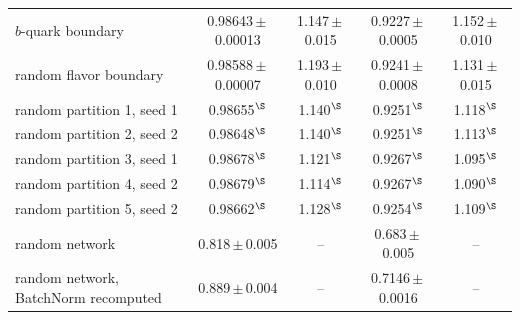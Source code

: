 \begin{landscape}
{\begin{center}
\begin{minipage}{\linewidth}
\begin{tabular*}{\linewidth}{@{\extracolsep{\fill}}lcccc@{}}
\quad $b$-quark boundary & 0.98643\,$\pm$\,0.00013 & 1.147\,$\pm$\,0.015 & 0.9227\,$\pm$\,0.0005 & 1.152\,$\pm$\,0.010 \\
\quad random flavor boundary & 0.98588\,$\pm$\,0.00007 & 1.193\,$\pm$\,0.010 & 0.9241\,$\pm$\,0.0008 & 1.131\,$\pm$\,0.015 \\
\quad random partition 1, seed 1 & 0.98655$^{\S}$ & 1.140$^{\S}$ & 0.9251$^{\S}$ & 1.118$^{\S}$ \\
\quad random partition 2, seed 2 & 0.98648$^{\S}$ & 1.140$^{\S}$ & 0.9251$^{\S}$ & 1.113$^{\S}$ \\
\quad random partition 3, seed 1 & 0.98678$^{\S}$ & 1.121$^{\S}$ & 0.9267$^{\S}$ & 1.095$^{\S}$ \\
\quad random partition 4, seed 2 & 0.98679$^{\S}$ & 1.114$^{\S}$ & 0.9267$^{\S}$ & 1.090$^{\S}$ \\
\quad random partition 5, seed 2 & 0.98662$^{\S}$ & 1.128$^{\S}$ & 0.9254$^{\S}$ & 1.109$^{\S}$ \\
random network & 0.818\,$\pm$\,0.005 & -- & 0.683\,$\pm$\,0.005 & -- \\
random network, BatchNorm recomputed & 0.889\,$\pm$\,0.004 & -- & 0.7146\,$\pm$\,0.0016 & -- \\
\bottomrule
\end{tabular*}
\end{minipage}
\end{center}
}
\end{landscape}
